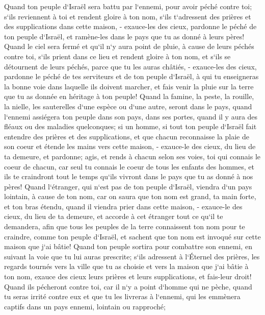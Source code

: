 \verse Quand ton peuple d`Israël sera battu par l`ennemi, pour avoir péché contre toi; s`ils reviennent à toi et rendent gloire à ton nom, s`ils t`adressent des prières et des supplications dans cette maison, - 
\verse exauce-les des cieux, pardonne le péché de ton peuple d`Israël, et ramène-les dans le pays que tu as donné à leurs pères! 
\verse Quand le ciel sera fermé et qu`il n`y aura point de pluie, à cause de leurs péchés contre toi, s`ils prient dans ce lieu et rendent gloire à ton nom, et s`ils se détournent de leurs péchés, parce que tu les auras châtiés, - 
\verse exauce-les des cieux, pardonne le péché de tes serviteurs et de ton peuple d`Israël, à qui tu enseigneras la bonne voie dans laquelle ils doivent marcher, et fais venir la pluie sur la terre que tu as donnée en héritage à ton peuple! 
\verse Quand la famine, la peste, la rouille, la nielle, les sauterelles d`une espèce ou d`une autre, seront dans le pays, quand l`ennemi assiégera ton peuple dans son pays, dans ses portes, quand il y aura des fléaux ou des maladies quelconques; 
\verse si un homme, si tout ton peuple d`Israël fait entendre des prières et des supplications, et que chacun reconnaisse la plaie de son coeur et étende les mains vers cette maison, - 
\verse exauce-le des cieux, du lieu de ta demeure, et pardonne; agis, et rends à chacun selon ses voies, toi qui connais le coeur de chacun, car seul tu connais le coeur de tous les enfants des hommes, 
\verse et ils te craindront tout le temps qu`ils vivront dans le pays que tu as donné à nos pères! 
\verse Quand l`étranger, qui n`est pas de ton peuple d`Israël, viendra d`un pays lointain, à cause de ton nom, 
\verse car on saura que ton nom est grand, ta main forte, et ton bras étendu, quand il viendra prier dans cette maison, - 
\verse exauce-le des cieux, du lieu de ta demeure, et accorde à cet étranger tout ce qu`il te demandera, afin que tous les peuples de la terre connaissent ton nom pour te craindre, comme ton peuple d`Israël, et sachent que ton nom est invoqué sur cette maison que j`ai bâtie! 
\verse Quand ton peuple sortira pour combattre son ennemi, en suivant la voie que tu lui auras prescrite; s`ils adressent à l`Éternel des prières, les regards tournés vers la ville que tu as choisie et vers la maison que j`ai bâtie à ton nom, 
\verse exauce des cieux leurs prières et leurs supplications, et fais-leur droit! 
\verse Quand ils pécheront contre toi, car il n`y a point d`homme qui ne pèche, quand tu seras irrité contre eux et que tu les livreras à l`ennemi, qui les emmènera captifs dans un pays ennemi, lointain ou rapproché; 
